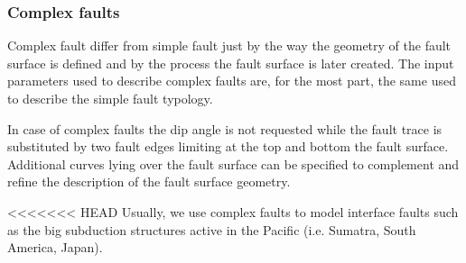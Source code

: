 \begin{itemize}
\subsubsection{Complex faults}
%
Complex fault differ from simple fault just by the way the geometry of 
the fault surface is defined and by the process the fault surface is later 
created. 
The input parameters used to describe complex faults are, for the most 
part, the same used to describe the simple fault typology. 

In case of complex faults the dip angle is not requested while the fault
trace is substituted by two fault edges limiting at the top and bottom 
the fault surface. Additional curves lying over the fault surface can be 
specified to complement and refine the description of the fault surface 
geometry.

<<<<<<< HEAD
Usually, we use complex faults to model interface faults such 
as the big subduction structures active in the Pacific (i.e. 
Sumatra, South America, Japan).


\end{itemize}
